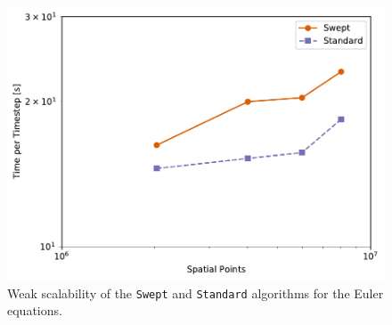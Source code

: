 \documentclass[mca,article,submit,moreauthors,pdftex]{Definitions/mdpi}
\def\Swept{\texttt{Swept}}
\def\Standard{\texttt{Standard}}
\begin{document}
\begin{figure}[htbp]
    \widefigure
    \includegraphics[scale=0.85]{figs/weakScalabilityEuler.pdf}
    \caption{Weak scalability of the \Swept{} and \Standard{} algorithms for the Euler equations.}
    \label{fig:scalabilityEuler}
\end{figure}
\end{document}
